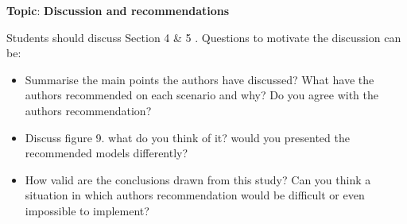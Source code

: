 \documentclass[
  letterpaper,
  DIV=11,
  numbers=noendperiod]{scrartcl}
\providecommand{\tightlist}{%
  \setlength{\itemsep}{0pt}\setlength{\parskip}{0pt}}\usepackage{longtable,booktabs,array}
\begin{document}
\begin{tcolorbox}[enhanced jigsaw, colbacktitle=quarto-callout-tip-color!10!white, colframe=quarto-callout-tip-color-frame, left=2mm, rightrule=.15mm, breakable, bottomrule=.15mm, toptitle=1mm, arc=.35mm, toprule=.15mm, coltitle=black, colback=white, opacityback=0, bottomtitle=1mm, titlerule=0mm, title={Example: Group 5}, opacitybacktitle=0.6, leftrule=.75mm]

\textbf{Topic}: \textbf{Discussion and recommendations}

Students should discuss Section 4 \& 5 . Questions to motivate the
discussion can be:

\begin{itemize}
\tightlist
\item
  Summarise the main points the authors have discussed? What have the
  authors recommended on each scenario and why? Do you agree with the
  authors recommendation?
\item
  Discuss figure 9. what do you think of it? would you presented the
  recommended models differently?
\item
  How valid are the conclusions drawn from this study? Can you think a
  situation in which authors recommendation would be difficult or even
  impossible to implement?
\end{itemize}

\end{tcolorbox}
\end{document}
